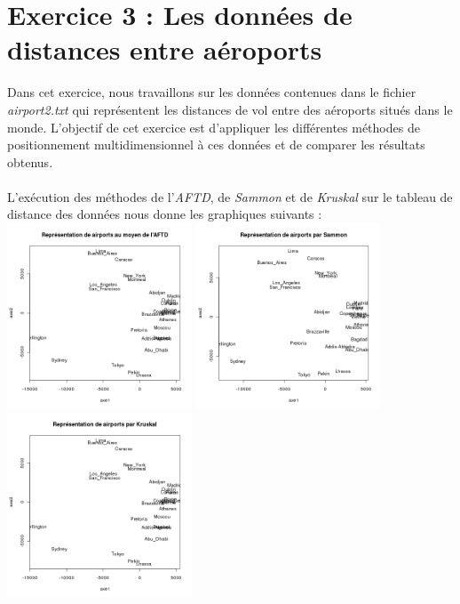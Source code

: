 \documentclass[a4paper, 10pt]{article}
\begin{document}
\section*{Exercice 3 : Les données de distances entre aéroports}
Dans cet exercice, nous travaillons sur les données contenues dans le fichier \textit{airport2.txt} qui représentent les distances de vol
entre des aéroports situés dans le monde. L'objectif de cet exercice est d'appliquer les différentes méthodes
de positionnement multidimensionnel à ces données et de comparer les résultats obtenus.\\ \\
L'exécution des méthodes de l'\textit{AFTD}, de \textit{Sammon} et de \textit{Kruskal} sur le tableau de distance des données
nous donne les graphiques suivants :\\
\includegraphics[height = 5.5cm, width = 5.5cm]{plots/plot_airports_cmdscale.png}
\includegraphics[height = 5.5cm, width = 5.5cm]{plots/plot_airports_sammon.png}
\includegraphics[height = 5.5cm, width = 5.5cm]{plots/plot_airports_kruskal.png}\\
\end{document}
